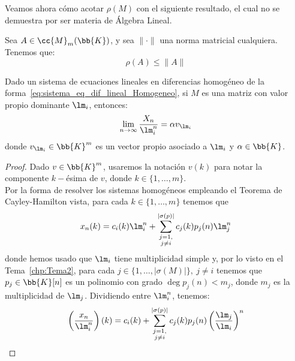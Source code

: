 Veamos ahora cómo acotar $\rho(M)$ con el siguiente resultado, el cual no se demuestra por ser materia de Álgebra Lineal.
\begin{prop}
    Sea $A\in \cc{M}_m(\bb{K})$, y sea $\|\cdot \|$ una norma matricial cualquiera. Tenemos que:
    \begin{equation*}
        \rho(A) \leq \|A\|
    \end{equation*}
\end{prop}

\begin{prop}
    Dado un sistema de ecuaciones lineales en diferencias homogéneo  de la forma~\ref{eq:sistema_eq_dif_lineal_Homogeneo}, si $M$ es una matriz con valor propio dominante $\lm_i$, entonces:
    \begin{equation*}
        \lim_{n\to \infty} \frac{X_n}{\lm_i^n} = \alpha v_{\lm_i}
    \end{equation*}
    donde $v_{\lm_i}\in \bb{K}^m$ es un vector propio asociado a $\lm_i$ y $\alpha\in \bb{K}$.

    \begin{proof}
        Dado $v\in \bb{K}^m$, usaremos la notación $v(k)$ para notar la componente $k-$ésima de $v$, donde $k\in \{1,\dots,m\}$.\\
        
        Por la forma de resolver los sistemas homogéneos empleando el Teorema de Cayley-Hamilton vista,
        para cada $k\in \{1,\dots, m\}$ tenemos que
        \begin{equation*}
            x_n(k) = c_i(k)\lm_i^n + \sum_{\substack{j=1,\\j\neq i}}^{| \sigma(p)|} c_j(k)p_j(n)\lm_j^n
        \end{equation*}
        donde hemos usado que $\lm_i$ tiene multiplicidad simple y, por lo visto en el Tema~\ref{chp:Tema2}, para cada $j\in \{1,\dots,|\sigma(M)|\},~j\neq i$ tenemos que $p_j\in \bb{K}[n]$ es un polinomio con grado $\deg p_j(n)<m_j$, donde $m_j$ es la multiplicidad de $\lm_j$. Dividiendo entre $\lm_i^n$, tenemos:
        \begin{equation*}
            \left(\frac{x_n}{\lm_i^n}\right)(k) = c_i(k) + \sum_{\substack{j=1,\\j\neq i}}^{| \sigma(p)|} c_j(k)p_j(n)\left(\frac{\lm_j}{\lm_i}\right)^n
        \end{equation*}


\end{proof}
\end{prop}
